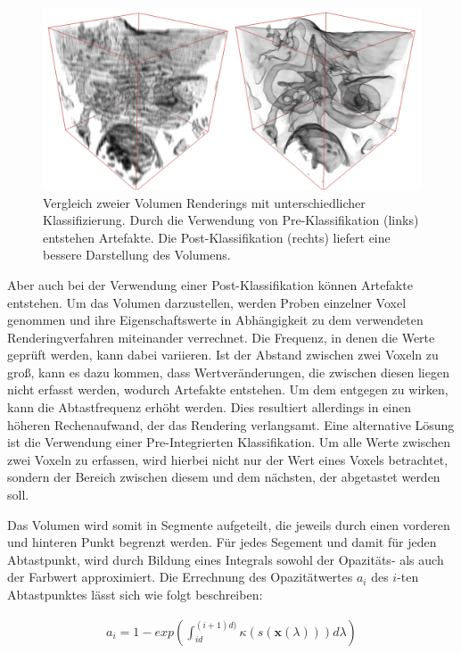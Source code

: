 \begin{figure}[!htb]
	\centering
	\includegraphics[width=0.7\linewidth]{images/prepostclassification.png}
	\caption{Vergleich zweier Volumen Renderings mit unterschiedlicher Klassifizierung. Durch die Verwendung von Pre-Klassifikation (links) entstehen Artefakte. Die Post-Klassifikation (rechts) liefert eine bessere Darstellung des Volumens.}
	\label{img:prepost}
\end{figure}
\FloatBarrier

Aber auch bei der Verwendung einer Post-Klassifikation können Artefakte entstehen.
Um das Volumen darzustellen, werden Proben einzelner Voxel genommen und ihre Eigenschaftswerte in Abhängigkeit zu dem verwendeten Renderingverfahren miteinander verrechnet. 
Die Frequenz, in denen die Werte geprüft werden, kann dabei variieren. Ist der Abstand zwischen zwei Voxeln zu groß, kann es dazu kommen, dass Wertveränderungen, die zwischen diesen liegen nicht erfasst werden, wodurch Artefakte entstehen. 
Um dem entgegen zu wirken, kann die Abtastfrequenz erhöht werden. Dies resultiert allerdings in einen höheren Rechenaufwand, der das Rendering verlangsamt.
Eine alternative Lösung ist die Verwendung einer Pre-Integrierten Klassifikation.
Um alle Werte zwischen zwei Voxeln zu erfassen, wird hierbei nicht nur der Wert eines Voxels betrachtet, sondern der Bereich zwischen diesem und dem nächsten, der abgetastet werden soll. 

Das Volumen wird somit in Segmente aufgeteilt, die jeweils durch einen vorderen und hinteren Punkt begrenzt werden. Für jedes Segement und damit für jeden Abtastpunkt, wird durch Bildung eines Integrals sowohl der Opazitäts- als auch der Farbwert approximiert. 
Die Errechnung des Opazitätwertes $a_i$ des  $i$-ten Abtastpunktes lässt sich wie folgt beschreiben:

\begin{align}
   a_i = 1-exp\left ( \int_{id}^{(i+1)d)} \kappa\left ( s(\mathbf{x}(\lambda)) \right ) d\lambda  \right )
\end{align}

